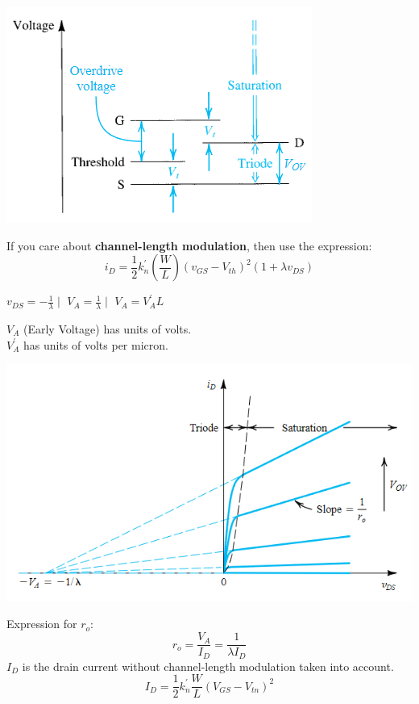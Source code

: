 \documentclass[a4paper]{article}
\begin{document}
\begin{multicols}{3}
\includegraphics[width=\linewidth]{imgs/mosfet_operation.png}

If you care about \textbf{channel-length modulation}, then use
the expression:
$$i_D=\frac{1}{2}k_n^{'}\left(\frac{W}{L}\right)(v_{GS}-V_{th})^2(1+\lambda v_{DS})$$

$v_{DS}=-\frac{1}{\lambda} \mid$
$V_A=\frac{1}{\lambda} \mid$
$V_A=V_A^{'}L$  

$V_A$ (Early Voltage) has units of volts.\\
$V_A^{'}$ has units of volts per micron.

\includegraphics[width=\linewidth]{imgs/va_mosfet.png}

Expression for $r_o$:
$$r_o=\frac{V_A}{I_D}=\frac{1}{\lambda I_D}$$
$I_D$ is the drain current without channel-length
modulation taken into account.
$$I_D=\frac{1}{2}k_n^{'}\frac{W}{L}(V_{GS}-V_{tn})^2$$


\end{multicols}
\end{document}
